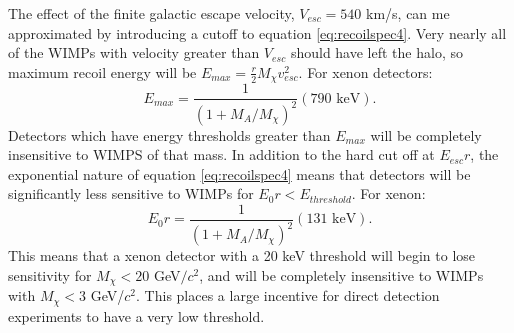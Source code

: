 The effect of the finite galactic escape velocity, $V_{esc}=540$ km/s, can me approximated by introducing a cutoff to equation \ref{eq:recoilspec4}. Very nearly all of the WIMPs with velocity greater than $V_{esc}$ should have left the halo, so maximum recoil energy will be $E_{max}=\frac{r}{2}M_{\chi}v_{esc}^2$. For xenon detectors:
\begin{equation}
E_{max}=\frac{1}{(1+M_A/M_{\chi})^2}(790 \text{\ keV}).
\end{equation}
Detectors which have energy thresholds greater than $E_{max}$ will be completely insensitive to WIMPS of that mass. In addition to the hard cut off at $E_{esc}r$, the exponential nature of equation \ref{eq:recoilspec4} means that detectors will be significantly less sensitive to WIMPs for $E_0r<E_{threshold}$. For xenon:
\begin{equation}
E_{0}r=\frac{1}{(1+M_A/M_{\chi})^2}(131 \text{\ keV}).
\end{equation}
This means that a xenon detector with a 20 keV threshold will begin to lose sensitivity for $M_{\chi}<20$ GeV$/c^2$, and will be completely insensitive to WIMPs with $M_{\chi}<3$ GeV/$c^2$. This places a large incentive for direct detection experiments to have a very low threshold.

